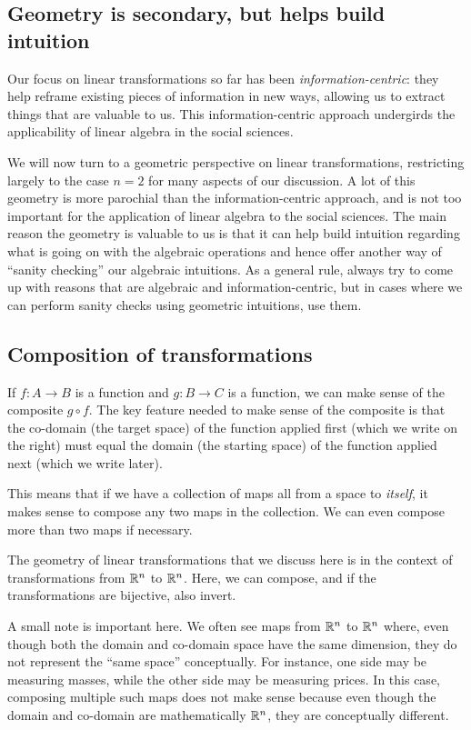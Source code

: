 \documentclass[10pt]{amsart}
\begin{document}
\subsection{Geometry is secondary, but helps build intuition}

Our focus on linear transformations so far has been {\em
  information-centric}: they help reframe existing pieces of
information in new ways, allowing us to extract things that are
valuable to us. This information-centric approach undergirds the
applicability of linear algebra in the social sciences.

We will now turn to a geometric perspective on linear transformations,
restricting largely to the case $n = 2$ for many aspects of our
discussion. A lot of this geometry is more parochial than the
information-centric approach, and is not too important for the
application of linear algebra to the social sciences. The main reason
the geometry is valuable to us is that it can help build intuition
regarding what is going on with the algebraic operations and hence
offer another way of ``sanity checking'' our algebraic intuitions. As
a general rule, always try to come up with reasons that are algebraic
and information-centric, but in cases where we can perform sanity
checks using geometric intuitions, use them.

\subsection{Composition of transformations}

If $f:A \to B$ is a function and $g:B \to C$ is a function, we can
make sense of the composite $g \circ f$. The key feature needed to
make sense of the composite is that the co-domain (the target space)
of the function applied first (which we write on the right) must equal
the domain (the starting space) of the function applied next (which we
write later).

This means that if we have a collection of maps all from a space to
{\em itself}, it makes sense to compose any two maps in the
collection. We can even compose more than two maps if necessary.

The geometry of linear transformations that we discuss here is in the
context of transformations from $\mathbb{R}^n$ to $\mathbb{R}^n$. Here, we can
compose, and if the transformations are bijective, also invert.

A small note is important here. We often see maps from $\mathbb{R}^n$ to
$\mathbb{R}^n$ where, even though both the domain and co-domain space have the
same dimension, they do not represent the ``same space''
conceptually. For instance, one side may be measuring masses, while
the other side may be measuring prices. In this case, composing
multiple such maps does not make sense because even though the domain
and co-domain are mathematically $\mathbb{R}^n$, they are conceptually
different.
\end{document}
